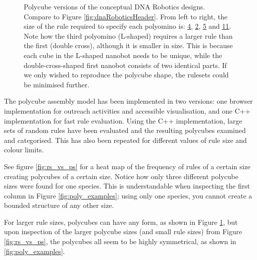 \begin{figure}
\caption{Polycube versions of the conceptual DNA Robotics designs. Compare to Figure \ref{fig:dnaRoboticsHeader}. From left to right, the size of the rule required to specify each polyomino is: \href{https://akodiat.github.io/polycubes/view?hexRule=040890040707840c00000000888a00000000101400000000}{\underline{4}}, \href{https://akodiat.github.io/polycubes/view?hexRule=0a040b0b080a840e00000000}{\underline{2}}, \href{https://akodiat.github.io/polycubes/view?hexRule=06000c0b00001284000b080a0090140b00000000188c0000000014980000}{\underline{5}} and \href{https://akodiat.github.io/polycubes/view?hexRule=0406008800008400240000008c0800000000903400000000980c2f2f10129c1a0000000094000000002214141c000000000028a40000ac3200000000b43000000000}{\underline{11}}. Note how the third polyomino (L-shaped) requires a larger rule than the first (double cross), although it is smaller in size. This is because each cube in the L-shaped nanobot needs to be unique, while the double-cross-shaped first nanobot consists of two identical parts. If we only wished to reproduce the polycube shape, the rulesets could be minimised further.}
\label{fig:dnaRoboticPolycubes}\end{figure}

The polycube assembly model has been implemented in two versions: one browser implementation for outreach activities and accessible visualisation, and one C++ implementation for fast rule evaluation. Using the C++ implementation, large sets of random rules have been evaluated and the resulting polycubes examined and categorised. This has also been repeated for different values of rule size and colour limits.

See figure \ref{fig:rs_vs_ps} for a heat map of the frequency of rules of a certain size creating polycubes of a certain size. Notice how only three different polycube sizes were found for one species. This is understandable when inspecting the first column in Figure \ref{fig:poly_examples}; using only one species, you cannot create a bounded structure of any other size.

For larger rule sizes, polycubes can have any form, as shown in Figure \ref{fig:dnaRoboticPolycubes}, but upon inspection of the larger polycube sizes (and small rule sizes) from Figure \ref{fig:rs_vs_ps}, the polycubes all seem to be highly symmetrical, as shown in \ref{fig:poly_examples}.


